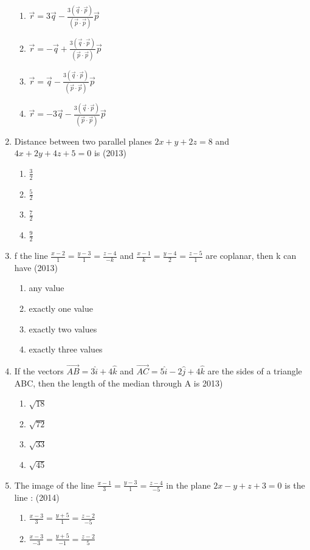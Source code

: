 \documentclass[12pt]{article}
\providecommand{\brak}[1]{\ensuremath{\left(#1\right)}}
\begin{document}
\begin{enumerate}
\begin{enumerate}
\item  $\vec{r}=3\vec{q}-\frac{3\brak{\vec{q}\cdot\vec{p}}}{\brak{\vec{p}\cdot\vec{p}}}\vec{p}$
\item  $\vec{r}=-\vec{q}+\frac{3\brak{\vec{q}\cdot\vec{p}}}{\brak{\vec{p}\cdot\vec{p}}}\vec{p}$
\item  $\vec{r}=\vec{q}-\frac{3\brak{\vec{q}\cdot\vec{p}}}{\brak{\vec{p}\cdot\vec{p}}}\vec{p}$
\item  $\vec{r}=-3\vec{q}-\frac{3\brak{\vec{q}\cdot\vec{p}}}{\brak{\vec{p}\cdot\vec{p}}}\vec{p}$
\end{enumerate}
\item Distance between two parallel planes $2x+y+2z=8$ and $4x+2y+4z+5=0$ is (2013)
\begin{enumerate}
\item $\frac{3}{2}$
\item $\frac{5}{2}$
\item $\frac{7}{2}$
\item $\frac{9}{2}$
\end{enumerate}
\item f the line $\frac{x-2}{1}=\frac{y-3}{1}=\frac{z-4}{-k}$ and $\frac{x-1}{k}=\frac{y-4}{2}=\frac{z-5}{1}$ are coplanar, then k can have (2013)
\begin{enumerate}
\item any value 
\item exactly one value
\item exactly two values
\item exactly three values
\end{enumerate}
\item If the vectors $\overrightarrow{AB}=3\hat{i}+4\hat{k}$ and $\overrightarrow{AC}=5\hat{i}-2\hat{j}+4\hat{k}$ are the sides of a triangle ABC, then the length of the median through A is 2013)
\begin{enumerate}
\item $\sqrt{18}$
\item $\sqrt{72}$
\item $\sqrt{33}$
\item $\sqrt{45}$
\end{enumerate}
\item The image of the line  $\frac{x-1}{3}=\frac{y-3}{1}=\frac{z-4}{-5}$ in the plane $2x-y+z+3=0$ is the line : (2014)
\begin{enumerate}
\item $\frac{x-3}{3}=\frac{y+5}{1}=\frac{z-2}{-5}$
\item $\frac{x-3}{-3}=\frac{y+5}{-1}=\frac{z-2}{5}$

\end{enumerate}
\end{enumerate}
\end{document}
